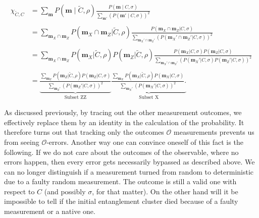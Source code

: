 \begin{align}
      \label{eq:lxe-subset-err}
      \chi_{\tilde{C},C} &= \sum_{\mathbf{m}} P(\mathbf{m} \mid \tilde{C}, \rho) \frac{P(\mathbf{m} \mid
      C, \sigma)}{\sum_{\mathbf{m}'}\left(P(\mathbf{m}' \mid
      C, \sigma)\right)^2} \nonumber\\
      \nonumber\\
      &= \sum_{\mathbf{m}_X \cap \mathbf{m}_Z} P(\mathbf{m}_X \cap \mathbf{m}_Z |
        \tilde{C}, \rho) \frac{P(\mathbf{m}_X \cap \mathbf{m}_Z| C,
        \sigma)}{\sum_{\mathbf{m}_X' \cap \mathbf{m}_Z'} \left(P(\mathbf{m}_X' \cap
        \mathbf{m}_Z'|C,\sigma)\right)^2}\nonumber\\
        \nonumber\\
      &= \sum_{\mathbf{m}_X \cap \mathbf{m}_Z} P(\mathbf{m}_X | \tilde{C}, \rho) P(
        \mathbf{m}_Z | \tilde{C}, \rho) \frac{P(\mathbf{m}_X | C, \sigma) P( \mathbf{m}_Z|
        C, \sigma)}{\sum_{\mathbf{m}_X' \cap \mathbf{m}_Z'}
          \left(P(\mathbf{m}_X' | C,
        \sigma) P( \mathbf{m}_Z'|C,\sigma)\right)^2}\nonumber\\
        \nonumber\\
      &= \underbrace{\frac{\sum_{\mathbf{m}_Z} P(\mathbf{m}_Z | \tilde{C}, \rho)
          P(\mathbf{m}_Z | C, \sigma)}{\sum_{\mathbf{m}_Z'}
          \left(P(\mathbf{m}_Z' |
          C, \sigma)\right)^2}}_{\text{Subset ZZ}}
          \underbrace{\frac{\sum_{\mathbf{m}_X} P(\mathbf{m}_X | \tilde{C}, \rho)
          P(\mathbf{m}_X | C, \sigma)}{\sum_{\mathbf{m}_X'}
          \left(P(\mathbf{m}_X' |
          C, \sigma)\right)^2}.}_{\text{Subset X}}
\end{align}

As discussed previously, by tracing out the other measurement outcomes, we
effectively replace them by an identity in the calculation of the probability.
It therefore turns out that tracking only the outcomes $\mathcal{O}$ measurements prevents us from
seeing $\mathcal{O}$-errors. Another way one can convince oneself of this fact
is the following.
If we do not care about the outcomes of the observable, where no errors
happen, then every error gets necessarily bypassed as described above. We can
no longer distinguish if a measurement turned from random to deterministic due
to a faulty random measurement. The outcome is still a valid one with respect to
$C$ (and possibly $\sigma$, for that matter). On the other hand will it be
impossible to tell if the initial entanglement cluster died because of a faulty
measurement or a native one. 

